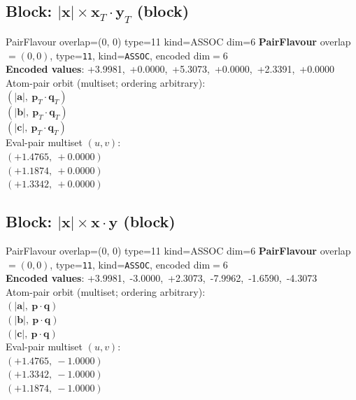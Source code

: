 \documentclass[a4paper,11pt]{article}
\newcommand{\vc}[1]{\ensuremath{\mathbf{#1}}}
\newcommand{\dnfagmiihhiejm}[1]{|\vc{#1}|}
\newcommand{\pdcegfomjfhook}[2]{\mathbf{#1} \cdot \mathbf{#2}}
\newcommand{\fpbeomcfokjooi}[2]{\mathbf{#1}_T \cdot \mathbf{#2}_T}
\begin{document}
\subsection{Block: $\dnfagmiihhiejm{x} \times \fpbeomcfokjooi{x}{y}$  (block)}
    PairFlavour  overlap=(0, 0)  type=11  kind=ASSOC  dim=6
\textbf{PairFlavour} overlap$=(0, 0)$, type=\texttt{11}, kind=\texttt{ASSOC}, encoded dim$=6$\\
\textbf{      Encoded values}: +3.9981,\ +0.0000,\ +5.3073,\ +0.0000,\ +2.3391,\ +0.0000\\
\quad Atom-pair orbit (multiset; ordering arbitrary):\\
$(\dnfagmiihhiejm{a},\ \fpbeomcfokjooi{p}{q})$\\
$(\dnfagmiihhiejm{b},\ \fpbeomcfokjooi{p}{q})$\\
$(\dnfagmiihhiejm{c},\ \fpbeomcfokjooi{p}{q})$\\
\quad Eval-pair multiset $(u, v)$:\\
$(+1.4765,\ +0.0000)$\\
$(+1.1874,\ +0.0000)$\\
$(+1.3342,\ +0.0000)$\\

\subsection{Block: $\dnfagmiihhiejm{x} \times \pdcegfomjfhook{x}{y}$  (block)}
    PairFlavour  overlap=(0, 0)  type=11  kind=ASSOC  dim=6
\textbf{PairFlavour} overlap$=(0, 0)$, type=\texttt{11}, kind=\texttt{ASSOC}, encoded dim$=6$\\
\textbf{      Encoded values}: +3.9981,\ -3.0000,\ +2.3073,\ -7.9962,\ -1.6590,\ -4.3073\\
\quad Atom-pair orbit (multiset; ordering arbitrary):\\
$(\dnfagmiihhiejm{a},\ \pdcegfomjfhook{p}{q})$\\
$(\dnfagmiihhiejm{b},\ \pdcegfomjfhook{p}{q})$\\
$(\dnfagmiihhiejm{c},\ \pdcegfomjfhook{p}{q})$\\
\quad Eval-pair multiset $(u, v)$:\\
$(+1.4765,\ -1.0000)$\\
$(+1.3342,\ -1.0000)$\\
$(+1.1874,\ -1.0000)$\\
\end{document}

